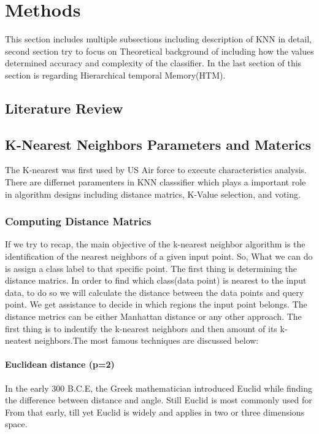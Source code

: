 \documentclass[conference]{IEEEtran}
\begin{document}
\section{Methods}

This section includes multiple subsections including description of KNN in detail, second section try to focus on Theoretical background of including how the values determined accuracy and complexity  of the classifier. In the last section of this section is regarding Hierarchical temporal Memory(HTM). 



\subsection{Literature Review}



\subsection{K-Nearest Neighbors Parameters and Materics}
The K-nearest was first used by US Air force to execute characteristics analysis. There are differnet paramenters in KNN classsifier which plays a important role in algorithm designs including distance matrics, K-Value selection, and voting. 




\subsubsection{Computing Distance Matrics}
If we try to recap, the main objective of the k-nearest neighbor algorithm is the identification of the nearest neighbors of a given input point. So, What we can do is assign a class label to that specific point. The first thing is determining the distance matrics. In order to find which class(data point) is nearest to the input data, to do so we will calculate the distance between the data points and query point. We get assistance to decide in which regions the input point belongs. The distance metrics can be either Manhattan distance or any other approach. The first thing is to indentify the k-nearest neighbors and then amount of its k-neatest neighbors.The most famous techniques are discussed below:  


\paragraph{Euclidean distance (p=2)}
In the early 300 B.C.E, the Greek mathematician introduced Euclid while finding the difference between distance and angle. Still Euclid is most commonly used for From that early, till yet Euclid is widely and applies in two or three dimensions space. 
\end{document}
